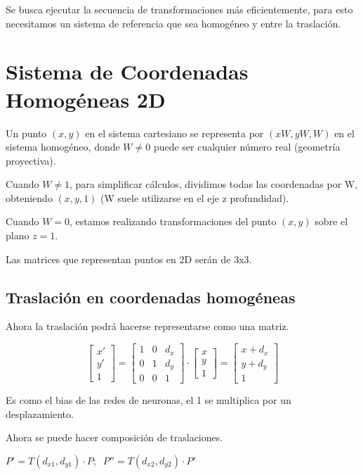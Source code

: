 Se busca ejecutar la secuencia de transformaciones más eficientemente, para esto necesitamos un sistema de referencia que sea homogéneo y entre la traslación.

\section{Sistema de Coordenadas Homogéneas 2D}
Un punto $( x , y )$ en el sistema cartesiano se representa por $( xW , yW , W )$ en el sistema homogéneo, donde $W\neq 0$ puede ser cualquier número real (geometría proyectiva).

Cuando $W\neq 1$, para simplificar cálculos, dividimos todas las coordenadas por W, obteniendo $( x , y , 1 )$ (W suele utilizarse en el eje z profundidad).

Cuando $W = 0$, estamos realizando transformaciones del punto $( x , y )$ sobre el plano $z = 1$.

Las matrices que representan puntos en 2D serán de 3x3.

\subsection{Traslación en coordenadas homogéneas}
Ahora la traslación podrá hacerse representarse como una matriz.

$$\left[\begin{matrix}
x' \\ y' \\ 1
\end{matrix}\right] =
\left[\begin{matrix}
1 & 0 & d_x \\ 0 & 1 & d_y \\ 0 & 0 & 1
\end{matrix}\right] \cdot
\left[\begin{matrix}
x \\ y \\ 1
\end{matrix}\right]=
\left[\begin{matrix}
x + d_x \\ y + d_y \\ 1
\end{matrix}\right]$$

Es como el bias de las redes de neuronas, el 1 se multiplica por un desplazamiento.

Ahora se puede hacer composición de traslaciones.

$P'=T(d_{x1},d_{y1}) \cdot P; \;\;P''=T(d_{x2},d_{y2}) \cdot P'$

